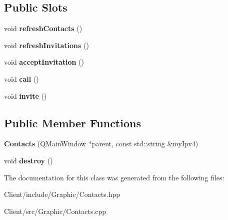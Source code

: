 \subsection*{Public Slots}
\begin{DoxyCompactItemize}
\item 
\mbox{\label{classbbl_1_1cli_1_1graphics_1_1_contacts_a0fbe75c5e15075b29588798cdc486dce}} 
void {\bfseries refresh\+Contacts} ()
\item 
\mbox{\label{classbbl_1_1cli_1_1graphics_1_1_contacts_a652b388e1900c2cae9026479d672e14b}} 
void {\bfseries refresh\+Invitations} ()
\item 
\mbox{\label{classbbl_1_1cli_1_1graphics_1_1_contacts_a26fa213a7daa06e1efb4bafe7d7dfca5}} 
void {\bfseries accept\+Invitation} ()
\item 
\mbox{\label{classbbl_1_1cli_1_1graphics_1_1_contacts_aa5659455a94a881f4082785969eae9a6}} 
void {\bfseries call} ()
\item 
\mbox{\label{classbbl_1_1cli_1_1graphics_1_1_contacts_ac882230cad3f0585e536ffcd3a158882}} 
void {\bfseries invite} ()
\end{DoxyCompactItemize}
\subsection*{Public Member Functions}
\begin{DoxyCompactItemize}
\item 
\mbox{\label{classbbl_1_1cli_1_1graphics_1_1_contacts_a35a81d6f0ca8bad4d0f5639428450b29}} 
{\bfseries Contacts} (Q\+Main\+Window $\ast$parent, const std\+::string \&my\+Ipv4)
\item 
\mbox{\label{classbbl_1_1cli_1_1graphics_1_1_contacts_aedb4583a8dc30861d89e6f28ead2f46a}} 
void {\bfseries destroy} ()
\end{DoxyCompactItemize}


The documentation for this class was generated from the following files\+:\begin{DoxyCompactItemize}
\item 
Client/include/\+Graphic/Contacts.\+hpp\item 
Client/src/\+Graphic/Contacts.\+cpp\end{DoxyCompactItemize}
